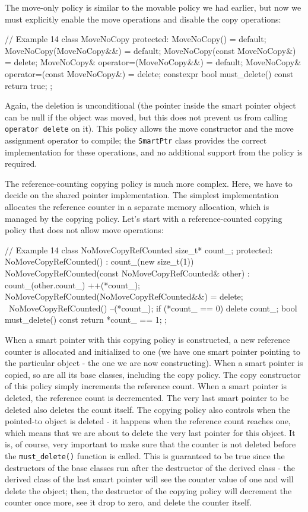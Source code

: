 The move-only policy is similar to the movable policy we had earlier, but now we must explicitly enable the move operations and disable the copy operations:

\begin{code}
// Example 14
class MoveNoCopy {
  protected:
  MoveNoCopy() = default;
  MoveNoCopy(MoveNoCopy&&) = default;
  MoveNoCopy(const MoveNoCopy&) = delete;
  MoveNoCopy& operator=(MoveNoCopy&&) = default;
  MoveNoCopy& operator=(const MoveNoCopy&) = delete;
  constexpr bool must_delete() const { return true; }
};
\end{code}

Again, the deletion is unconditional (the pointer inside the smart pointer object can be null if the object was moved, but this does not prevent us from calling \texttt{operator\ delete} on it). This policy allows the move constructor and the move assignment operator to compile; the \texttt{SmartPtr} class provides the correct implementation for these operations, and no additional support from the policy is required.

The reference-counting copying policy is much more complex. Here, we have to decide on the shared pointer implementation. The simplest implementation allocates the reference counter in a separate memory allocation, which is managed by the copying policy. Let's start with a reference-counted copying policy that does not allow move operations:

\begin{code}
// Example 14
class NoMoveCopyRefCounted {
  size_t* count_;
  protected:
  NoMoveCopyRefCounted() : count_(new size_t(1)) {}
  NoMoveCopyRefCounted(const NoMoveCopyRefCounted& other) :
    count_(other.count_)
  {
    ++(*count_);
  }
  NoMoveCopyRefCounted(NoMoveCopyRefCounted&&) = delete;
  ~NoMoveCopyRefCounted() {
    --(*count_);
    if (*count_ == 0) {
      delete count_;
    }
  }
  bool must_delete() const { return *count_ == 1; }
};
\end{code}

When a smart pointer with this copying policy is constructed, a new reference counter is allocated and initialized to one (we have one smart pointer pointing to the particular object - the one we are now constructing). When a smart pointer is copied, so are all its base classes, including the copy policy. The copy constructor of this policy simply increments the reference count. When a smart pointer is deleted, the reference count is decremented. The very last smart pointer to be deleted also deletes the count itself. The copying policy also controls when the pointed-to object is deleted - it happens when the reference count reaches one, which means that we are about to delete the very last pointer for this object. It is, of course, very important to make sure that the counter is not deleted before the \texttt{must\_delete()} function is called. This is guaranteed to be true since the destructors of the base classes run after the destructor of the derived class - the derived class of the last smart pointer will see the counter value of one and will delete the object; then, the destructor of the copying policy will decrement the counter once more, see it drop to zero, and delete the counter itself.

